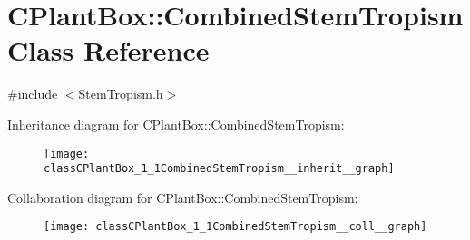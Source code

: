\hypertarget{classCPlantBox_1_1CombinedStemTropism}{}\section{C\+Plant\+Box\+:\+:Combined\+Stem\+Tropism Class Reference}
\label{classCPlantBox_1_1CombinedStemTropism}


{\ttfamily \#include $<$Stem\+Tropism.\+h$>$}



Inheritance diagram for C\+Plant\+Box\+:\+:Combined\+Stem\+Tropism\+:\nopagebreak
\begin{figure}[H]
\begin{center}
\leavevmode
\texttt{[image: classCPlantBox\_1\_1CombinedStemTropism\_\_inherit\_\_graph]}
\end{center}
\end{figure}


Collaboration diagram for C\+Plant\+Box\+:\+:Combined\+Stem\+Tropism\+:\nopagebreak
\begin{figure}[H]
\begin{center}
\leavevmode
\texttt{[image: classCPlantBox\_1\_1CombinedStemTropism\_\_coll\_\_graph]}
\end{center}
\end{figure}
